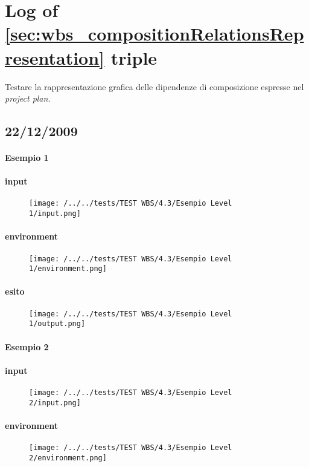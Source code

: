 \section{Log of \ref{sec:wbs_compositionRelationsRepresentation} triple}

Testare la rappresentazione grafica delle dipendenze di composizione espresse
nel \emph{project plan}.

\subsection{22/12/2009}
\paragraph{Esempio 1}
\paragraph{input}
\begin{figure}
\centering
\texttt{[image: /../../tests/TEST WBS/4.3/Esempio Level 1/input.png]}
\end{figure}
\paragraph{environment}
\begin{figure}
\centering
\texttt{[image: /../../tests/TEST WBS/4.3/Esempio Level 1/environment.png]}
\end{figure}
\paragraph{esito}
\begin{figure}
\centering
\texttt{[image: /../../tests/TEST WBS/4.3/Esempio Level 1/output.png]}
\end{figure}

\paragraph{Esempio 2}
\paragraph{input}
\begin{figure}
\centering
\texttt{[image: /../../tests/TEST WBS/4.3/Esempio Level 2/input.png]}
\end{figure}
\paragraph{environment}
\begin{figure}
\centering
\texttt{[image: /../../tests/TEST WBS/4.3/Esempio Level 2/environment.png]}
\end{figure}
